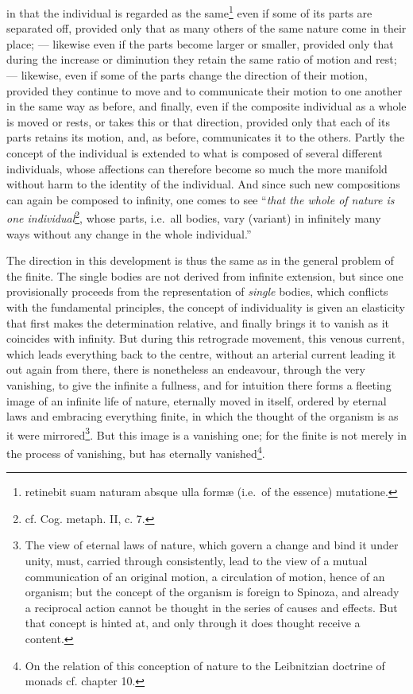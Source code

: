 \documentclass[12pt,a4paper,openany]{book}
\newcommand{\opage}[1]{\marginnote{\footnotesize\textit{[#1]}}}
\begin{document}
in that the individual is regarded as the
same\footnote{retinebit suam naturam absque ulla formæ (i.e.\
of the essence) mutatione.} even if some of its parts are separated off, provided
only that as many others of the same nature come in their place; --- likewise
even if the parts become larger or smaller, provided only that during
the increase or diminution they retain the same ratio of
motion and rest; --- likewise, even if some of the parts change
the direction of their motion, provided they continue to move and
to communicate their motion to one another in the same way
as before, and finally, even if the composite individual as a
whole is moved or rests, or takes this or that
direction, provided only that each of its parts retains its motion, and,
as before, communicates it to the others. Partly the
concept of the individual is extended to what is composed of several different individuals,
whose affections can therefore become so much the more
manifold without harm to the identity of the individual. And since
such new compositions can again be composed to
infinity, one comes to see ``\emph{that the whole of nature is one
individual}\footnote{cf. Cog. metaph. II, c. 7.}, whose parts, i.e.\
all bodies, vary (variant) in infinitely many ways without
any change in the whole individual.''

The direction in this development is thus the same as in the
general problem of the finite. The single bodies are not derived
from infinite extension, but
\opage{81}\setcounter{footnote}{0}since one provisionally proceeds from the representation of \emph{single} bodies,
which conflicts with the fundamental principles, the concept of individuality
is given an elasticity that first makes the
determination relative, and finally brings it to vanish
as it coincides with infinity. But during this
retrograde movement, this venous current, which leads everything
back to the centre, without an arterial current leading it out again
from there, there is nonetheless an endeavour, through the very
vanishing, to give the infinite a fullness, and for intuition
there forms a fleeting image of an infinite life of nature, eternally
moved in itself, ordered by eternal laws and embracing everything finite,
in which the thought of the organism is as it were mirrored\footnote{The
view of eternal laws of nature, which govern a
change and bind it under unity, must, carried through
consistently, lead to the view of a mutual communication of an
original motion, a circulation of motion, hence of an
organism; but the concept of the organism is foreign to Spinoza, and
already a reciprocal action cannot be thought in the series of
causes and effects. But that concept is hinted at, and only through
it does thought receive a content.}. But this image is a
vanishing one; for the finite is not merely in the process of vanishing, but has
eternally vanished\footnote{On the relation of this conception of nature to
the Leibnitzian doctrine of monads cf. chapter 10.}.
\end{document}
